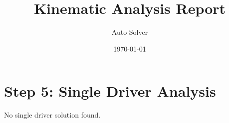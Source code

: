 \documentclass[12pt, a4paper]{article}
\title{\textbf{Kinematic Analysis Report}}
\author{Auto-Solver}
\date{\today}
\begin{document}
\maketitle
\section*{Step 5: Single Driver Analysis}
No single driver solution found.
\end{document}
